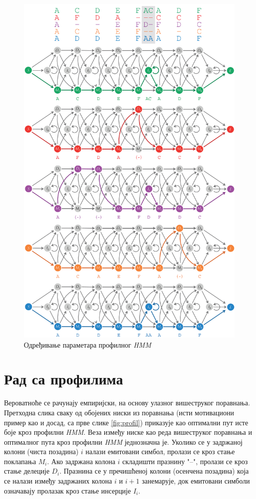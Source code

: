 \documentclass[12pt,oneside]{memoir}
\begin{document}
\begin{CJK}{UTF8}{ipxm}
\begin{figure}[H]
  \centering
  \includegraphics[height=.97\textheight]{prof_param.png}
  \caption{Одређивање параметара профилног \textit{HMM} \cite{compeau2015}}
  \label{fig:prof_param}
\end{figure}

\section{Рад са профилима}
Вероватноће се рачунају емпиријски, на основу улазног вишеструког поравнања. Претходна слика сваку од обојених ниски из поравнања (исти мотивациони пример као и досад, са прве слике \ref{fig:profil}) приказује као оптимални пут исте боје кроз профилни \textit{HMM}. Веза између ниске као реда вишеструког поравнања и оптималног пута кроз профилни \textit{HMM} једнозначна је. Уколико се у задржаној колони (чиста позадина) $i$ налази емитовани симбол, пролази се кроз стање поклапања $M_i$. Ако задржана колона $i$ складишти празнину "--", пролази се кроз стање делеције $D_i$. Празнина се у пречишћеној колони (осенчена позадина) која се налази између задржаних колона $i$ и $i+1$ занемарује, док емитовани симболи означавају пролазак кроз стање инсерције $I_i$.


\end{CJK}
\end{document}
